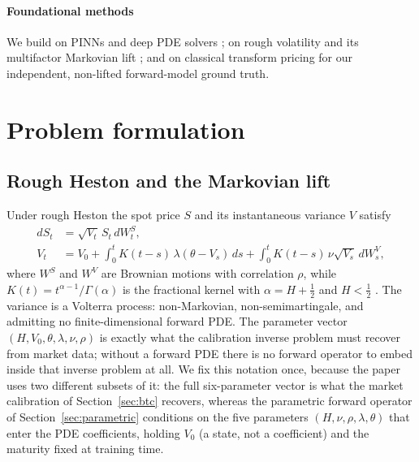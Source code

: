 \documentclass[preprint,12pt]{elsarticle}
\begin{document}
\paragraph{Foundational methods}
We build on PINNs \citep{raissi2019physics} and deep PDE solvers
\citep{sirignano2018dgm,han2018solving}; on rough volatility
\citep{gatheral2018volatility,eleuch2019characteristic} and its multifactor
Markovian lift \citep{abijaber2019multifactor,abijaber2019lifting}; and on
classical transform pricing \citep{heston1993closed,carr1999option} for our
independent, non-lifted forward-model ground truth.

\section{Problem formulation}
\label{sec:problem}

\subsection{Rough Heston and the Markovian lift}
Under rough Heston the spot price $S$ and its instantaneous variance $V$ satisfy
\begin{align}
  dS_t &= \sqrt{V_t}\,S_t\,dW^S_t, \\
  V_t  &= V_0 + \int_0^t K(t-s)\,\lambda(\theta - V_s)\,ds
          + \int_0^t K(t-s)\,\nu\sqrt{V_s}\,dW^V_s,
\end{align}
where $W^S$ and $W^V$ are Brownian motions with correlation $\rho$, while
$K(t)=t^{\alpha-1}/\Gamma(\alpha)$ is the fractional kernel with
$\alpha=H+\tfrac12$ and $H<\tfrac12$ \citep{gatheral2018volatility,eleuch2019characteristic}.
The variance is a Volterra process: non-Markovian, non-semimartingale, and
admitting no finite-dimensional forward PDE. The parameter vector
$(H,V_0,\theta,\lambda,\nu,\rho)$ is exactly what the calibration inverse problem
must recover from market data; without a forward PDE there is no forward operator
to embed inside that inverse problem at all. We fix this notation once, because
the paper uses two different subsets of it: the full six-parameter vector is what
the market calibration of Section~\ref{sec:btc} recovers, whereas the parametric
forward operator of Section~\ref{sec:parametric} conditions on the five
parameters $(H,\nu,\rho,\lambda,\theta)$ that enter the PDE coefficients, holding
$V_0$ (a state, not a coefficient) and the maturity fixed at training time.
\end{document}
